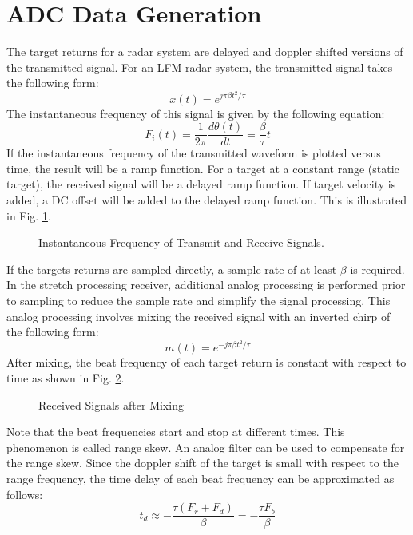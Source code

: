 \documentclass[conference]{IEEEtran}
\begin{document}
\section{ADC Data Generation}
The target returns for a radar system are delayed and doppler shifted versions of the transmitted signal. For an LFM radar system, the transmitted signal takes the following form:
\begin{equation}
x(t) = e^{j\pi\beta t^2/\tau}
\end{equation}
The instantaneous frequency of this signal is given by the following equation:
\begin{equation}
F_i(t) = \frac{1}{2\pi}\frac{d\theta(t)}{dt} = \frac{\beta}{\tau}t
\end{equation}
If the instantaneous frequency of the transmitted waveform is plotted versus time, the result will be a ramp function. For a target at a constant range (static target), the received signal will be a delayed ramp function. If target velocity is added, a DC offset will be added to the delayed ramp function. This is illustrated in Fig. \ref{inst_freq}.
\begin{figure}[H]
\centerline{}
\caption{Instantaneous Frequency of Transmit and Receive Signals.}
\label{inst_freq}
\end{figure}
If the targets returns are sampled directly, a sample rate of at least $\beta$ is required. In the stretch processing receiver, additional analog processing is performed prior to sampling to reduce the sample rate and simplify the signal processing. This analog processing involves mixing the received signal with an inverted chirp of the following form:
\begin{equation}
m(t) = e^{-j\pi\beta t^2/\tau}
\end{equation}
After mixing, the beat frequency of each target return is constant with respect to time as shown in Fig. \ref{beat_freq_new}.
\begin{figure}[H]
\centerline{}
\caption{Received Signals after Mixing}
\label{beat_freq_new}
\end{figure}
Note that the beat frequencies start and stop at different times. This phenomenon is called range skew. An analog filter can be used to compensate for the range skew. Since the doppler shift of the target is small with respect to the range frequency, the time delay of each beat frequency can be approximated as follows:
\begin{equation}
t_d \approx -\frac{\tau(F_r+F_d)}{\beta} = -\frac{\tau F_b}{\beta}
\end{equation}
\end{document}
